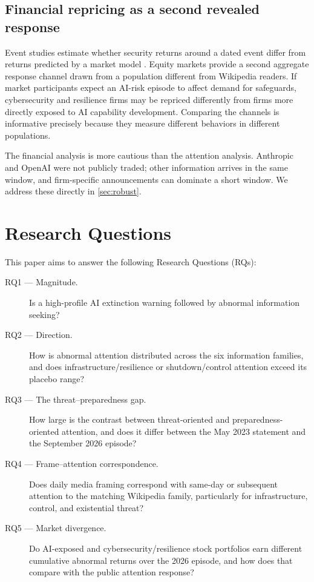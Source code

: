 \elsevierclasstrue\documentclass[preprint,12pt]{elsarticle}%
\begin{document}
\subsection{Financial repricing as a second revealed response}

Event studies estimate whether security returns around a dated event differ from returns predicted by a market model \citep{mackinlay1997event}. Equity markets provide a second aggregate response channel drawn from a population different from Wikipedia readers. If market participants expect an AI-risk episode to affect demand for safeguards, cybersecurity and resilience firms may be repriced differently from firms more directly exposed to AI capability development. Comparing the channels is informative precisely because they measure different behaviors in different populations.

The financial analysis is more cautious than the attention analysis. Anthropic and OpenAI were not publicly traded; other information arrives in the same window, and firm-specific announcements can dominate a short window. We address these directly in \cref{sec:robust}.


\section{Research Questions}

This paper aims to answer the following Research Questions (RQs):

\begin{description}%
\item[RQ1 --- Magnitude.] Is a high-profile AI extinction warning followed by abnormal information seeking? 
\item[RQ2 --- Direction.] How is abnormal attention distributed across the six information families, and does infrastructure/resilience or shutdown/control attention exceed its placebo range?
\item[RQ3 --- The threat--preparedness gap.] How large is the contrast between threat-oriented and preparedness-oriented attention, and does it differ between the May 2023 statement and the September 2026 episode?
\item[RQ4 --- Frame--attention correspondence.] Does daily media framing correspond with same-day or subsequent attention to the matching Wikipedia family, particularly for infrastructure, control, and existential threat?
\item[RQ5 --- Market divergence.] Do AI-exposed and cybersecurity/resilience stock portfolios earn different cumulative abnormal returns over the 2026 episode, and how does that compare with the public attention response?
\end{description}
\end{document}
